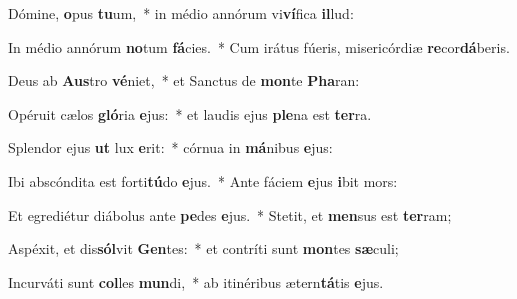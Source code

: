 \item Dómine, \textbf{o}pus \textbf{tu}um,~* in médio annórum vi\textbf{ví}fica \textbf{il}lud:
\item In médio annórum \textbf{no}tum \textbf{fá}cies.~* Cum irátus fúeris, misericórdiæ \textbf{re}cor\textbf{dá}beris.
\item Deus ab \textbf{Aus}tro \textbf{vé}niet,~* et Sanctus de \textbf{mon}te \textbf{Pha}ran:
\item Opéruit cælos \textbf{gló}ria \textbf{e}jus:~* et laudis ejus \textbf{ple}na est \textbf{ter}ra.
\item Splendor ejus \textbf{ut} lux \textbf{e}rit:~* córnua in \textbf{má}nibus \textbf{e}jus:
\item Ibi abscóndita est forti\textbf{tú}do \textbf{e}jus.~* Ante fáciem \textbf{e}jus \textbf{i}bit mors:
\item Et egrediétur diábolus ante \textbf{pe}des \textbf{e}jus.~* Stetit, et \textbf{men}sus est \textbf{ter}ram;
\item Aspéxit, et dis\textbf{sól}vit \textbf{Gen}tes:~* et contríti sunt \textbf{mon}tes \textbf{sæ}culi;
\item Incurváti sunt \textbf{col}les \textbf{mun}di,~* ab itinéribus ætern\textbf{tá}tis \textbf{e}jus.
